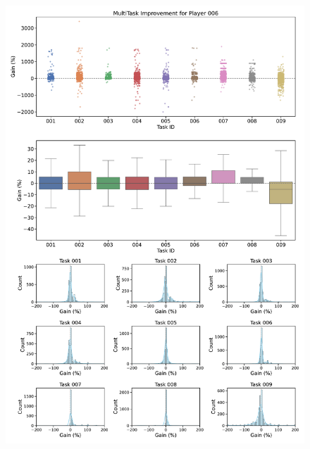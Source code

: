 \begin{figure}[ht]
  \centering
  \includegraphics[width=\textwidth]{figures/gain_validity/multitask/multitask_gain_player_00006.pdf}
\end{figure}
\clearpage

